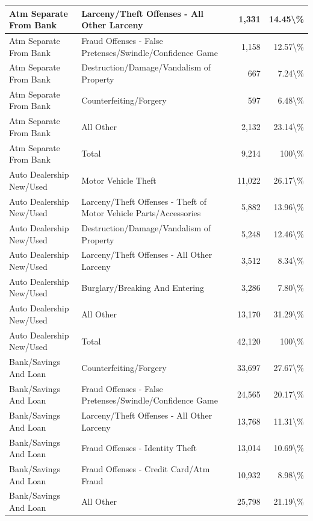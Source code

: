 \documentclass[
]{krantz}
\begin{document}
\begin{longtable}[t]{l|l|r|r}
\hline
Atm Separate From Bank & Larceny/Theft Offenses - All Other Larceny & 1,331 & 14.45\textbackslash{}\%\\
\hline
Atm Separate From Bank & Fraud Offenses - False Pretenses/Swindle/Confidence Game & 1,158 & 12.57\textbackslash{}\%\\
\hline
Atm Separate From Bank & Destruction/Damage/Vandalism of Property & 667 & 7.24\textbackslash{}\%\\
\hline
Atm Separate From Bank & Counterfeiting/Forgery & 597 & 6.48\textbackslash{}\%\\
\hline
Atm Separate From Bank & All Other & 2,132 & 23.14\textbackslash{}\%\\
\hline
Atm Separate From Bank & Total & 9,214 & 100\textbackslash{}\%\\
\hline
Auto Dealership New/Used & Motor Vehicle Theft & 11,022 & 26.17\textbackslash{}\%\\
\hline
Auto Dealership New/Used & Larceny/Theft Offenses - Theft of Motor Vehicle Parts/Accessories & 5,882 & 13.96\textbackslash{}\%\\
\hline
Auto Dealership New/Used & Destruction/Damage/Vandalism of Property & 5,248 & 12.46\textbackslash{}\%\\
\hline
Auto Dealership New/Used & Larceny/Theft Offenses - All Other Larceny & 3,512 & 8.34\textbackslash{}\%\\
\hline
Auto Dealership New/Used & Burglary/Breaking And Entering & 3,286 & 7.80\textbackslash{}\%\\
\hline
Auto Dealership New/Used & All Other & 13,170 & 31.29\textbackslash{}\%\\
\hline
Auto Dealership New/Used & Total & 42,120 & 100\textbackslash{}\%\\
\hline
Bank/Savings And Loan & Counterfeiting/Forgery & 33,697 & 27.67\textbackslash{}\%\\
\hline
Bank/Savings And Loan & Fraud Offenses - False Pretenses/Swindle/Confidence Game & 24,565 & 20.17\textbackslash{}\%\\
\hline
Bank/Savings And Loan & Larceny/Theft Offenses - All Other Larceny & 13,768 & 11.31\textbackslash{}\%\\
\hline
Bank/Savings And Loan & Fraud Offenses - Identity Theft & 13,014 & 10.69\textbackslash{}\%\\
\hline
Bank/Savings And Loan & Fraud Offenses - Credit Card/Atm Fraud & 10,932 & 8.98\textbackslash{}\%\\
\hline
Bank/Savings And Loan & All Other & 25,798 & 21.19\textbackslash{}\%\\

\end{longtable}
\end{document}
